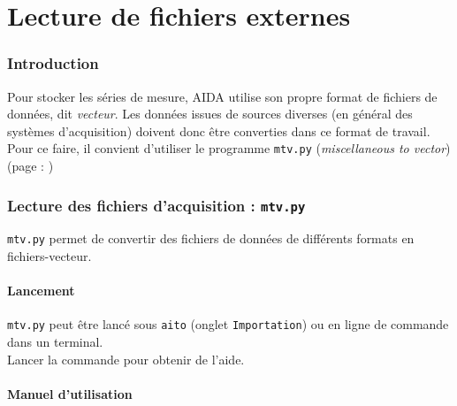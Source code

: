 \part{Lecture de fichiers externes}
\label{part:lecture}

\section{Introduction}
  Pour stocker les séries de mesure, AIDA utilise son propre format de 
fichiers de données, dit \textit{vecteur}. Les données issues de sources
diverses (en général des systèmes d'acquisition) doivent
donc être converties dans ce format de travail. Pour ce faire, il convient
d'utiliser le programme \texttt{mtv.py} (\textit{miscellaneous to vector})
(page : \pageref{lec-mtv})


\section{Lecture des fichiers d'acquisition : \texttt{mtv.py}}
\label{lec-mtv}
\texttt{mtv.py} permet de convertir des fichiers de données de différents
formats en fichiers-vecteur.

\subsection {Lancement}
\texttt{mtv.py} peut être lancé sous \texttt{aito} (onglet \texttt{Importation})
ou en ligne de commande dans un terminal. \\
Lancer la commande  pour obtenir de l'aide.

\subsection {Manuel d'utilisation}

